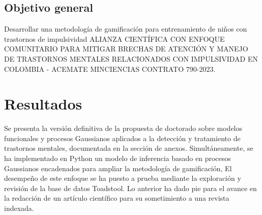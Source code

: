 \documentclass[10pt,xcdraw]{article}
\begin{document}
	\subsection{Objetivo general}
	Desarrollar una metodología de gamificación para entrenamiento de niños con trastornos de impulsividad ALIANZA CIENTÍFICA CON ENFOQUE COMUNITARIO PARA MITIGAR BRECHAS DE ATENCIÓN Y MANEJO DE TRASTORNOS MENTALES RELACIONADOS CON IMPULSIVIDAD EN COLOMBIA - ACEMATE MINCIENCIAS CONTRATO 790-2023.
	
	
	
	
	
	
	\section{Resultados}
	Se presenta la versión definitiva de la propuesta de doctorado sobre modelos funcionales y procesos Gaussianos aplicados a la detección y tratamiento de trastornos mentales, documentada en la sección de anexos. Simultáneamente, se ha implementado en Python un modelo de inferencia basado en procesos Gaussianos encadenados para ampliar la metodología de gamificación, El desempeño de este enfoque se ha puesto a prueba mediante la exploración y revisión de la base de datos Toadstool. Lo anterior ha dado pie para el avance en la redacción de un artículo científico para su sometimiento a una revista indexada.  

	
	
	
	
	
\end{document}
